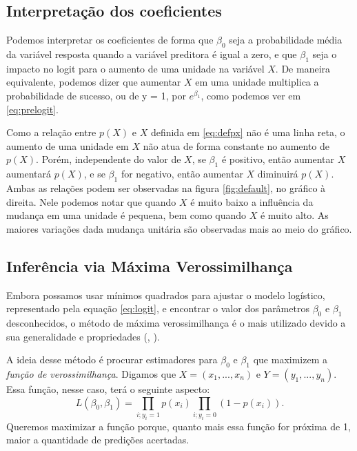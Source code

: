 \documentclass[
	12pt,				%
	openright,			%
	twoside,			%
	a4paper,			%
	english,			%
	brazil				%
	]{abntex2}
\begin{document}
 \subsection*{Interpretação dos coeficientes} 
 Podemos interpretar os coeficientes de forma que $\beta_{0}$ seja a probabilidade média da variável resposta quando a variável preditora é igual a zero, e que $\beta_{1}$ seja o impacto no logit para o aumento de uma unidade na variável $X$. De maneira equivalente, podemos dizer que aumentar $X$ em uma unidade multiplica a probabilidade de sucesso, ou de y = 1, por $e^{\beta_{1}}$, como podemos ver em \eqref{eq:prelogit}.
 
 Como a relação entre $p(X)$ e $X$ definida em \eqref{eq:defpx} não é uma linha reta, o aumento de uma unidade em $X$ não atua de forma constante no aumento de $p(X)$. Porém, independente do valor de $X$, se $\beta_{1}$ é positivo, então aumentar $X$ aumentará $p(X)$, e se $\beta_{1}$ for negativo, então aumentar $X$ diminuirá $p(X)$. Ambas as relações podem ser observadas na figura \ref{fig:default}, no gráfico à direita. Nele podemos notar que quando $X$ é muito baixo a influência da mudança em uma unidade é pequena, bem como quando $X$ é muito alto. As maiores variações dada mudança unitária são observadas mais ao meio do gráfico.
 
 \subsection{Inferência via Máxima Verossimilhança}
 Embora possamos usar mínimos quadrados para ajustar o modelo logístico, representado pela equação \eqref{eq:logit}, e encontrar o valor dos parâmetros $\beta_{0}$ e $\beta_{1}$ desconhecidos, o método de máxima verossimilhança é o mais utilizado devido a sua generalidade e propriedades (, \citeyear{james2013}).
 
 A ideia desse método é procurar estimadores para $\beta_{0}$ e $\beta_{1}$ que maximizem a \textit{função de verossimilhança}. Digamos que $X = (x_{1}, ..., x_{n})$ e $Y = (y_{1}, ..., y_{n})$. Essa função, nesse caso, terá o seguinte aspecto:
  \begin{equation}
    L(\beta_{0}, \beta_{1}) = \prod_{i; y_{i} = 1}{p(x_{i})} \prod_{i; y_{i} = 0}{(1 - p(x_{i}))} \label{eq:logitverossimilhanca}.
  \end{equation}
 Queremos maximizar a função porque, quanto mais essa função for próxima de 1, maior a quantidade de predições acertadas.
\end{document}
